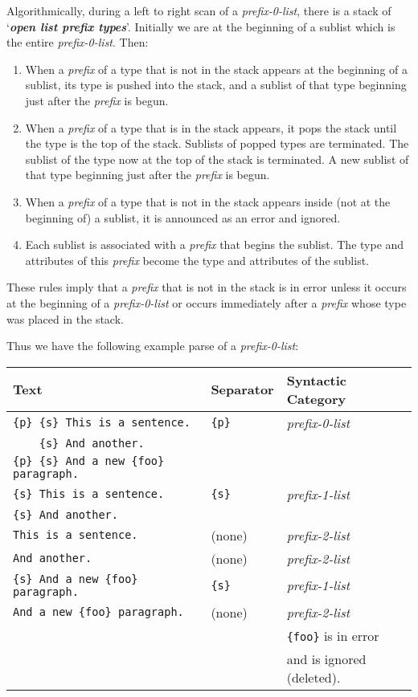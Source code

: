 \documentclass[12pt]{article}
\newcommand{\key}[1]{{\bf \em #1}\index{#1}}
\begin{document}
Algorithmically, during a left to right scan of a {\em prefix-0-list},
there is a stack of `\key{open list prefix types}'.  Initially we are
at the beginning of a sublist which is the entire {\em prefix-0-list}.
Then:
\begin{enumerate}

\item
When a {\em prefix} of a type that is not in the stack appears at the
beginning of a sublist, its type is pushed into the stack, and a sublist
of that type beginning just after the {\em prefix} is begun.

\item
When a {\em prefix} of a type that is in the stack appears, it pops the
stack until the type is the top of the stack.  Sublists of popped types
are terminated.  The sublist of the type now at the top of the stack
is terminated.  A new sublist of that type beginning just after the
{\em prefix} is begun.

\item
When a {\em prefix} of a type that is not in the stack appears inside
(not at the beginning of) a sublist, it is announced as an error and
ignored.

\item
Each sublist is associated with a {\em prefix} that begins the
sublist.  The type and attributes of this {\em prefix} become the
type and attributes of the sublist.

\end{enumerate}


These rules imply that a {\em prefix} that is not in the stack is
in error unless it occurs at the beginning of a {\em prefix-0-list}
or occurs immediately after a {\em prefix} whose type was placed
in the stack.

Thus we have the following example parse of a {\em prefix-0-list}:

\begin{tabular}{lll}
Text	& Separator &  Syntactic Category
\\\hline
\tt \{p\} \{s\} This is a sentence.	& \tt \{p\} & \em prefix-0-list \\
\tt ~~~ \{s\} And another. \\
\tt \{p\} \{s\} And a new \{foo\} paragraph.
\\\hline
\tt \{s\} This is a sentence.	& \tt \{s\} & \em prefix-1-list \\
\tt \{s\} And another.
\\\hline
\tt This is a sentence.	& (none) & \em prefix-2-list
\\\hline
\tt And another. & (none) & \em prefix-2-list
\\\hline
\tt \{s\} And a new \{foo\} paragraph. & \tt \{s\} & \em prefix-1-list
\\\hline
\tt And a new \{foo\} paragraph. & (none) & \em prefix-2-list \\
			       &        & {\tt \{foo\}} is in error \\
			       &        & and is ignored (deleted).
\end{tabular}
\end{document}
